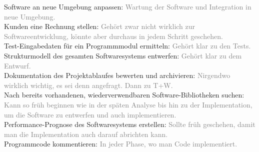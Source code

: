 \documentclass[a4paper,11pt]{scrartcl}
\begin{document}
	Software an neue Umgebung anpassen: \textcolor{gray}{Wartung der Software und Integration in neue Umgebung.}\\		
	Kunden eine Rechnung stellen: \textcolor{gray}{Gehört zwar nicht wirklich zur Softwareentwicklung, könnte aber durchaus in jedem Schritt geschehen.}\\				
	Test-Eingabedaten für ein Programmmodul ermitteln: \textcolor{gray}{Gehört klar zu den Tests.}\\	
	Strukturmodell des gesamten Softwaresystems entwerfen: \textcolor{gray}{Gehört klar zu dem Entwurf.}\\
	Dokumentation des Projektablaufes bewerten und archivieren: \textcolor{gray}{Nirgendwo wirklich wichtig, es sei denn angefragt. Dann zu T+W.}\\	
	Nach bereits vorhandenen, wiederverwendbaren Software-Bibliotheken suchen: \textcolor{gray}{Kann so früh beginnen wie in der späten Analyse bis hin zu der Implementation, um die Software zu entwerfen und auch implementieren.}\\
	Performance-Prognose des Softwaresystems erstellen: \textcolor{gray}{Sollte früh geschehen, damit man die Implementation auch darauf abrichten kann.}\\
	Programmcode kommentieren: \textcolor{gray}{In jeder Phase, wo man Code implementiert.}\\	
	
\newpage	
	
\end{document}
